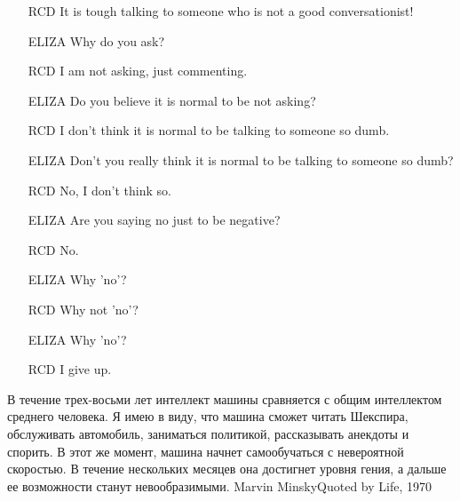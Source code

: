 \documentclass[24pt,pdf,hyperref={unicode}]{beamer}
\begin{document}
\begin{frame}
\begin{itemize}
\item[RCD] It is tough talking to someone who is not a good conversationist!
\item[ELIZA] Why do you ask?
\item[RCD] I am not asking, just commenting.
\item[ELIZA] Do you believe it is normal to be not asking?
\item[RCD] I don't think it is normal to be talking to someone so dumb.
\item[ELIZA] Don't you really think it is normal to be talking to someone so dumb?
\item[RCD] No, I don't think so.
\item[ELIZA] Are you saying no just to be negative?
\item[RCD] No.
\item[ELIZA] Why 'no'?
\item[RCD] Why not 'no'?
\item[ELIZA] Why 'no'?
\item[RCD] I give up.
\end{itemize}
\end{frame}


\begin{frame}
\end{frame}

\begin{frame}
\end{frame}


\begin{frame}
\end{frame}


\begin{frame}
\citate
{
В течение трех-восьми лет интеллект машины сравняется с общим интеллектом среднего человека. Я имею в виду, что машина сможет читать Шекспира, обслуживать автомобиль, заниматься политикой, рассказывать анекдоты и спорить. В этот же момент, машина начнет самообучаться с невероятной скоростью. В течение нескольких месяцев она достигнет уровня гения, а дальше ее возможности станут невообразимыми. 
}{Marvin Minsky}{Quoted by Life, 1970}
\end{frame}
\end{document}
